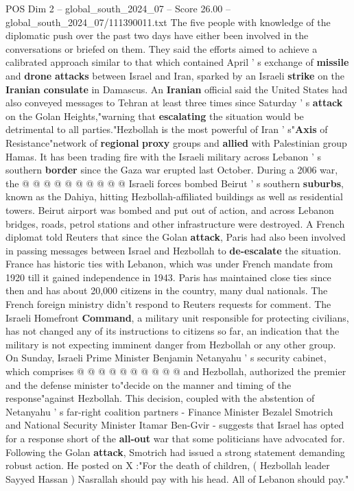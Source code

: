\begin{textsample}{POS Dim 2 – global\_south\_2024\_07 – Score 26.00 – global\_south\_2024\_07/111390011.txt}
The five people with knowledge of the diplomatic push over the past two days have either been involved in the conversations or briefed on them.
They said the efforts aimed to achieve a calibrated approach similar to that which contained April ' s exchange of \textbf{missile} and \textbf{drone} \textbf{attacks} between Israel and Iran, sparked by an Israeli \textbf{strike} on the \textbf{Iranian} \textbf{consulate} in Damascus.
An \textbf{Iranian} official said the United States had also conveyed messages to Tehran at least three times since Saturday ' s \textbf{attack} on the Golan Heights,"warning that \textbf{escalating} the situation would be detrimental to all parties."Hezbollah is the most powerful of Iran ' s"\textbf{Axis} of Resistance"network of \textbf{regional} \textbf{proxy} groups and \textbf{allied} with Palestinian group Hamas.
It has been trading fire with the Israeli military across Lebanon ' s southern \textbf{border} since the Gaza war erupted last October.
During a 2006 war, the @ @ @ @ @ @ @ @ @ @ Israeli forces bombed Beirut ' s southern \textbf{suburbs}, known as the Dahiya, hitting Hezbollah-affiliated buildings as well as residential towers.
Beirut airport was bombed and put out of action, and across Lebanon bridges, roads, petrol stations and other infrastructure were destroyed.
A French diplomat told Reuters that since the Golan \textbf{attack}, Paris had also been involved in passing messages between Israel and Hezbollah to \textbf{de-escalate} the situation.
France has historic ties with Lebanon, which was under French mandate from 1920 till it gained independence in 1943.
Paris has maintained close ties since then and has about 20,000 citizens in the country, many dual nationals.
The French foreign ministry didn't respond to Reuters requests for comment.
The Israeli Homefront \textbf{Command}, a military unit responsible for protecting civilians, has not changed any of its instructions to citizens so far, an indication that the military is not expecting imminent danger from Hezbollah or any other group.
On Sunday, Israeli Prime Minister Benjamin Netanyahu ' s security cabinet, which comprises @ @ @ @ @ @ @ @ @ @ and Hezbollah, authorized the premier and the defense minister to"decide on the manner and timing of the response"against Hezbollah.
This decision, coupled with the abstention of Netanyahu ' s far-right coalition partners - Finance Minister Bezalel Smotrich and National Security Minister Itamar Ben-Gvir - suggests that Israel has opted for a response short of the \textbf{all-out} war that some politicians have advocated for.
Following the Golan \textbf{attack}, Smotrich had issued a strong statement demanding robust action.
He posted on X :"For the death of children, ( Hezbollah leader Sayyed Hassan ) Nasrallah should pay with his head.
All of Lebanon should pay."

\end{textsample}
